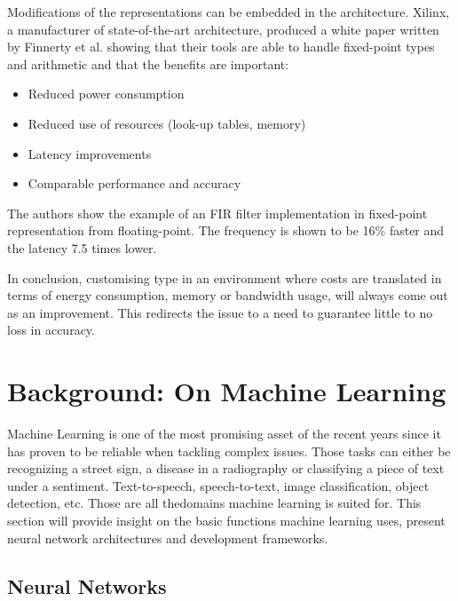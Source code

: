 Modifications of the representations can be embedded in the architecture. Xilinx, a manufacturer of state-of-the-art architecture, produced a white paper written by Finnerty et al. \cite{Xilinx2017} showing that their tools are able to handle fixed-point types and arithmetic and that the benefits are important:
\begin{itemize}
  \item Reduced power consumption
  \item Reduced use of resources (look-up tables, memory)
  \item Latency improvements
  \item Comparable performance and accuracy
\end{itemize}
The authors show the example of an FIR filter implementation in fixed-point representation from floating-point. The frequency is shown to be 16\% faster and the latency 7.5 times lower.

In conclusion, customising type in an environment where costs are translated in terms of energy consumption, memory or bandwidth usage, will always come out as an improvement. This redirects the issue to a need to guarantee little to no loss in accuracy.


\section{Background: On Machine Learning}

Machine Learning is one of the most promising asset of the recent years since it has proven to be reliable when tackling complex issues. Those tasks can either be recognizing a street sign, a disease in a radiography or classifying a piece of text under a sentiment. Text-to-speech, speech-to-text, image classification, object detection, etc. Those are all thedomains machine learning is suited for. This section will provide insight on the basic functions machine learning uses, present neural network architectures and development frameworks.


\subsection{Neural Networks}


